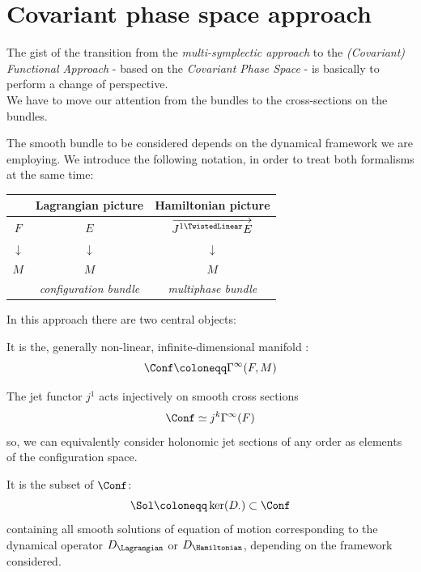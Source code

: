 \documentclass[a4paper,12pt,fleqn]{scrartcl}  %
\renewcommand{\LinDualJet}{ \overrightarrow{J^{1 \TwistedLinear}E} }
\begin{document}
\clearpage \newpage
\section{Covariant phase space approach}
The gist of the transition from the \emph{multi-symplectic approach} to the \emph{(Covariant) Functional Approach} - based on the \emph{Covariant Phase Space} - is basically to perform a change of perspective.\\
We have to move our attention from the bundles to the cross-sections on the bundles.

The smooth bundle to be considered depends on the dynamical framework we are employing.
We introduce the following notation, in order to treat both formalisms at the same time:
\begin{notation}
	\begin{center}
		\begin{tabular}{|c|c|c|}
			\hline
			 & Lagrangian picture & Hamiltonian picture \\
			\hline
			$F$		&	$E$		&	$\LinDualJet$	\\
			$\downarrow$ & $\downarrow$ & $\downarrow$ \\
			$M$ & $M$ & $M$ \\
			    & \emph{configuration bundle} & \emph{multiphase bundle} \\
			\hline
		\end{tabular}
	\end{center}
\end{notation}


In this approach there are two central objects:

	\begin{definition}\label{Def:ConfSpace}
		It is the, generally non-linear, infinite-dimensional manifold :
		\begin{displaymath}
			\Conf \coloneqq \Gamma^\infty(F,M)
		\end{displaymath}
	\end{definition}
%
	\begin{remark}
		The jet functor $j^1$ acts injectively on smooth cross sections
		\begin{displaymath}
			\Conf \simeq j^k \Gamma^\infty(F)
		\end{displaymath}
		so, we can equivalently consider holonomic jet sections of any order as elements of the configuration space.
	\end{remark}	
%
	\begin{definition}\label{Def:SolSpace}
		It is the subset of $\Conf$:
		\begin{displaymath}
			\Sol \coloneqq \ker(D_\cdot) \subset \Conf
		\end{displaymath}
		containing all smooth solutions of equation of motion corresponding to the  dynamical operator $D_\Lagrangian$ or $D_\Hamiltonian$, depending on the framework considered.
	\end{definition}
\end{document}

